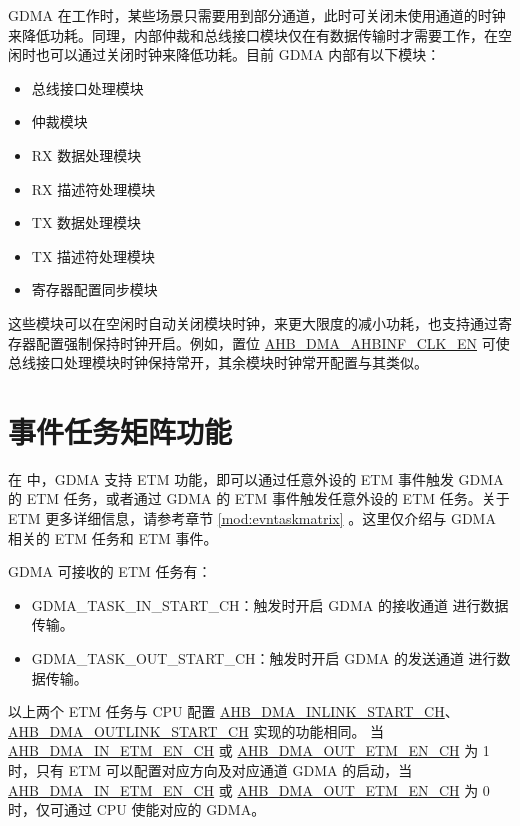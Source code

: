 \documentclass[main\_\_CN.tex]{subfiles}
\begin{document}
GDMA 在工作时，某些场景只需要用到部分通道，此时可关闭未使用通道的时钟来降低功耗。同理，内部仲裁和总线接口模块仅在有数据传输时才需要工作，在空闲时也可以通过关闭时钟来降低功耗。目前 GDMA 内部有以下模块：
\begin{itemize}
    \item 总线接口处理模块
    \item 仲裁模块
    \item RX 数据处理模块
    \item RX 描述符处理模块
    \item TX 数据处理模块
    \item TX 描述符处理模块
    \item 寄存器配置同步模块
\end{itemize}

这些模块可以在空闲时自动关闭模块时钟，来更大限度的减小功耗，也支持通过寄存器配置强制保持时钟开启。例如，置位 \hyperref[fielddesc:AHBDMAAHBINFCLKEN]{AHB\_DMA\_AHBINF\_CLK\_EN} 可使总线接口处理模块时钟保持常开，其余模块时钟常开配置与其类似。


\section{事件任务矩阵功能} \label{sec:dma-etm-func}

在 \chipname{} 中，GDMA 支持 ETM 功能，即可以通过任意外设的 ETM 事件触发 GDMA 的 ETM 任务，或者通过 GDMA 的 ETM 事件触发任意外设的 ETM 任务。关于 ETM 更多详细信息，请参考章节 \ref{mod:evntaskmatrix} 。这里仅介绍与 GDMA 相关的 ETM 任务和 ETM 事件。


GDMA 可接收的 ETM 任务有：

\begin{itemize}
\item GDMA\_TASK\_IN\_START\_CH：触发时开启 GDMA 的接收通道  进行数据传输。
\item GDMA\_TASK\_OUT\_START\_CH：触发时开启 GDMA 的发送通道  进行数据传输。
\end{itemize}

\begin{tiplisting}
以上两个 ETM 任务与 CPU 配置 \hyperref[fielddesc:AHBDMAINLINKSTARTCHN]{AHB\_DMA\_INLINK\_START\_CH}、\hyperref[fielddesc:AHBDMAOUTLINKSTARTCHN]{AHB\_DMA\_OUTLINK\_START\_CH} 实现的功能相同。 当 \hyperref[fielddesc:AHBDMAINETMENCHN]{AHB\_DMA\_IN\_ETM\_EN\_CH} 或 \hyperref[fielddesc:AHBDMAOUTETMENCHN]{AHB\_DMA\_OUT\_ETM\_EN\_CH} 为 1 时，只有 ETM 可以配置对应方向及对应通道 GDMA 的启动，当 \hyperref[fielddesc:AHBDMAINETMENCHN]{AHB\_DMA\_IN\_ETM\_EN\_CH} 或 \hyperref[fielddesc:AHBDMAOUTETMENCHN]{AHB\_DMA\_OUT\_ETM\_EN\_CH} 为 0 时，仅可通过 CPU 使能对应的 GDMA。
\end{tiplisting}
\end{document}
